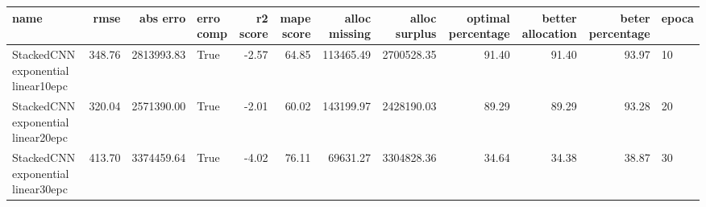 \begin{tabular}{lrrlrrrrrrrl}
\toprule
name & rmse & abs erro & erro comp & r2 score & mape score & alloc missing & alloc surplus & optimal percentage & better allocation & beter percentage & epoca \\
\midrule
StackedCNN exponential linear10epc & 348.76 & 2813993.83 & True & -2.57 & 64.85 & 113465.49 & 2700528.35 & 91.40 & 91.40 & 93.97 & 10 \\
StackedCNN exponential linear20epc & 320.04 & 2571390.00 & True & -2.01 & 60.02 & 143199.97 & 2428190.03 & 89.29 & 89.29 & 93.28 & 20 \\
StackedCNN exponential linear30epc & 413.70 & 3374459.64 & True & -4.02 & 76.11 & 69631.27 & 3304828.36 & 34.64 & 34.38 & 38.87 & 30 \\
\bottomrule
\end{tabular}

